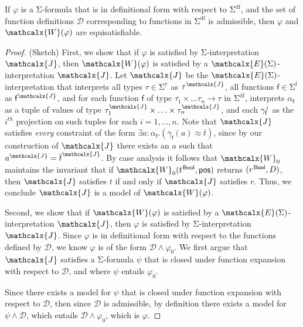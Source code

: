 \documentclass[runningheads,a4paper]{llncs}
\newcommand{\con}[1]{\mathsf{#1}}
\renewcommand\vec[1]{\overline{#1}}
\let\oldSigma=\Sigma
\def\Sigma{\mathrm{\oldSigma}}
\let\oldwedge=\wedge
\def\wedge{\mathrel{\oldwedge}}
\newcommand{\teq}{\approx}
\newcommand{\I}{\mathcalx{J}} %
\newcommand{\J}{\mathcalx{J}}
\newcommand{\conv}{\mathcalx{W}}
\newcommand{\ssorts}[1]{#1^\mathrm{y}}
\newcommand{\sfuns}[1]{#1^\mathrm{f}}
\newcommand{\sfundefs}[1]{#1^\mathrm{df}}
\newcommand{\ptrue}{\con{pos}}
\newcommand\ty[1]{\con{#1}}
\newcommand{\Bool}{\ty{Bool}}
\newcommand\concret{\gamma} %
\newcommand{\vecfarg}[1]{\vec{\concret}_{#1}}
\newcommand{\fargx}[2]{\concret^{\vthinspace#2}_{#1}}
\newcommand{\fargsort}[1]{\alpha_{#1}}
\newcommand{\extendsig}[1]{\mathcalx{E}( #1 )}
\newcommand{\vthinspace}{\kern+0.083333em}
\newcommand{\typ}[1]{^{\vthinspace #1}}
\begin{document}
\begin{theorem}
If $\varphi$ is a $\Sigma$-formula that is in definitional form with respect to $\sfundefs{\Sigma}$,
and the set of function definitions $\mathcal{D}$ corresponding to functions in $\sfundefs{\Sigma}$ is admissible,
then $\varphi$ and $\conv( \varphi )$ are equisatisfiable.
\end{theorem}
\begin{proof}
(Sketch)  First, we show that if $\varphi$ is satisfied by $\Sigma$-interpretation $\I$, then $\conv( \varphi )$ is satisfied by a $\extendsig{\Sigma}$-interpretation $\J$.
Let $\J$ be the $\extendsig{\Sigma}$-interpretation that interprets all types $\tau \in \ssorts{\Sigma}$ as $\tau^\I$,
all functions $\con{f} \in \sfuns{\Sigma}$ as $\con{f}^\I$,
and for each function $\con{f}$ of type $\tau_1 \times \ldots \tau_n \rightarrow \tau$ in $\sfundefs{\Sigma}$, 
interprets $\fargsort{\con{f}}$ as a tuple of values of type $\tau_1^\I \times \ldots \times \tau_n^\I$,
and each $\fargx{\con{f}}{i}$ as the $i^{th}$ projection on such tuples for each $i = 1, \ldots, n$.
Note that $\J$ satisfies \emph{every} constraint of the form $\exists a : {\fargsort{\con{f}}}. ( \vecfarg{\con{f}}( a ) \teq \vec t )$,
since by our construction of $\J$ there exists an $a$ such that $a^\J = \vec t^\J$.
By case analysis it follows that $\conv_0$ maintains the invariant that
if $\conv_0( t\typ{\Bool}, \ptrue )$ returns $( r\typ{\Bool}, D )$,
then $\I$ satisfies $t$ if and only if $\J$ satisfies $r$.
Thus, we conclude $\J$ is a model of $\conv( \varphi )$.

Second, we show that if $\conv( \varphi )$ is satisfied by a $\extendsig{\Sigma}$-interpretation $\I$, then $\varphi$ is satisfied by $\Sigma$-interpretation $\J$.
Since $\varphi$ is in definitional form with respect to the functions defined by $\mathcal{D}$, we know $\varphi$ is of the form $\mathcal{D} \wedge \varphi_0$.
We first argue that $\I$ satisfies a $\Sigma$-formula $\psi$ that is closed under function expansion with respect to $\mathcal{D}$,
and where $\psi$ entails $\varphi_0$.

Since there exists a model for $\psi$ that is closed under function expansion with respect to $\mathcal{D}$, 
then since $\mathcal{D}$ is admissible,
by definition there exists a model for $\psi \wedge \mathcal{D}$, which entails $\mathcal{D} \wedge \varphi_0$, which is $\varphi$.
\end{proof}
\end{document}

